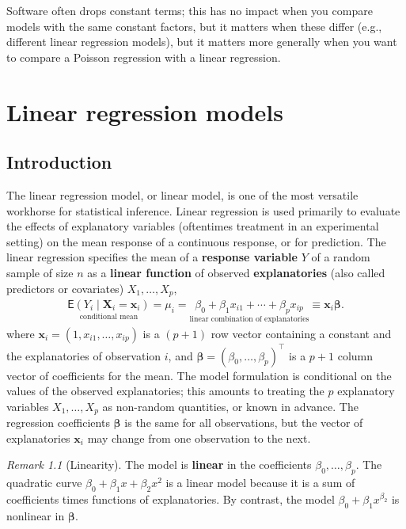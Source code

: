 \documentclass[
  11pt,
  letterpaper,
]{scrbook}
\theoremstyle{plain}
\theoremstyle{definition}
\theoremstyle{definition}
\theoremstyle{plain}
\theoremstyle{remark}
\newtheorem{refremark}{Remark}[chapter]
\begin{document}
Software often drops constant terms; this has no impact when you compare
models with the same constant factors, but it matters when these differ
(e.g., different linear regression models), but it matters more
generally when you want to compare a Poisson regression with a linear
regression.


\chapter{Linear regression models}\label{linmod}

\section{Introduction}\label{introduction}

The linear regression model, or linear model, is one of the most
versatile workhorse for statistical inference. Linear regression is used
primarily to evaluate the effects of explanatory variables (oftentimes
treatment in an experimental setting) on the mean response of a
continuous response, or for prediction. The linear regression specifies
the mean of a \textbf{response variable} \(Y\) of a random sample of
size \(n\) as a \textbf{linear function} of observed
\textbf{explanatories} (also called predictors or covariates)
\(X_1, \ldots, X_p\), \begin{align}
\underset{\text{conditional mean}}{\mathsf{E}(Y_i \mid \boldsymbol{X}_i=\boldsymbol{x}_i)}=\mu_i=\underset{\text{linear combination of explanatories}}{\beta_0 + \beta_1x_{i1} + \cdots + \beta_p x_{ip}}\equiv \mathbf{x}_i\boldsymbol{\beta}.
\end{align} where \(\mathbf{x}_i = (1, x_{i1}, \ldots, x_{ip})\) is a
\((p+1)\) row vector containing a constant and the explanatories of
observation \(i\), and
\(\boldsymbol{\beta} = (\beta_0, \ldots, \beta_p)^\top\) is a \(p+1\)
column vector of coefficients for the mean. The model formulation is
conditional on the values of the observed explanatories; this amounts to
treating the \(p\) explanatory variables \(X_1, \ldots, X_p\) as
non-random quantities, or known in advance. The regression coefficients
\(\boldsymbol{\beta}\) is the same for all observations, but the vector
of explanatories \(\mathbf{x}_i\) may change from one observation to the
next.

\begin{refremark}[Linearity]
The model is \textbf{linear} in the coefficients
\(\beta_0, \ldots, \beta_p\). The quadratic curve
\(\beta_0 + \beta_1x + \beta_2 x^2\) is a linear model because it is a
sum of coefficients times functions of explanatories. By contrast, the
model \(\beta_0 + \beta_1x^{\beta_2}\) is nonlinear in
\(\boldsymbol{\beta}\).

\label{rem-linearity}

\end{refremark}
\end{document}
